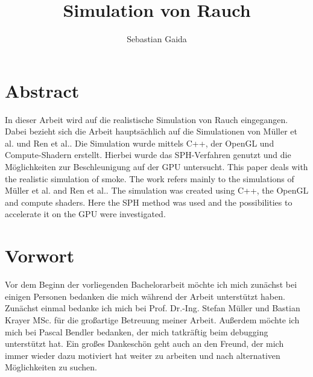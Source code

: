 \documentclass[intern,palatino]{cgBA}
\author{Sebastian Gaida}
\title{Simulation von Rauch}
\begin{document}
	\maketitle
	\newpage
	\tableofcontents
	\clearpage         %
	


\section*{Abstract}\label{abstract}

In dieser Arbeit wird auf die realistische Simulation von Rauch eingegangen. Dabei bezieht sich die Arbeit hauptsächlich auf die Simulationen von Müller et al.\cite{muller2003particle} und Ren et al.\cite{ren2016fast}. Die Simulation wurde mittels C++, der OpenGL und Compute-Shadern erstellt. Hierbei wurde das SPH-Verfahren genutzt und die Möglichkeiten zur Beschleunigung auf der GPU untersucht.
\newline \newline
This paper deals with the realistic simulation of smoke. The work refers mainly to the simulations of Müller et al.\cite{muller2003particle} and Ren et al.\cite{ren2016fast}. The simulation was created using C++, the OpenGL and compute shaders. Here the SPH method was used and the possibilities to accelerate it on the GPU were investigated.
\newpage


\section{Vorwort}\label{vorwort}

Vor dem Beginn der vorliegenden Bachelorarbeit möchte ich mich zunächst bei einigen Personen bedanken die mich während der Arbeit unterstützt haben.
\newline \newline
Zunächst einmal bedanke ich mich bei Prof. Dr.-Ing. Stefan Müller und Bastian Krayer MSc. für die großartige Betreuung meiner Arbeit.
\newline
Außerdem möchte ich mich bei Pascal Bendler bedanken, der mich tatkräftig beim debugging unterstützt hat.
\newline
Ein großes Dankeschön geht auch an den Freund, der mich immer wieder dazu motiviert hat weiter zu arbeiten und nach alternativen Möglichkeiten zu suchen.
\newpage
\end{document}
